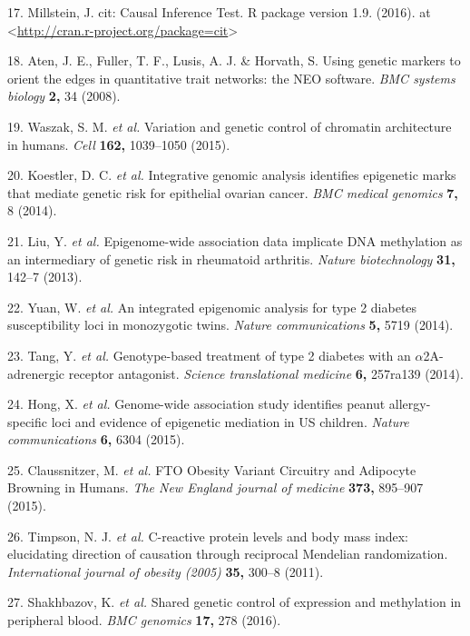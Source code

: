 \documentclass[]{article}
\begin{document}
\hypertarget{ref-Millstein2016}{}
17. Millstein, J. cit: Causal Inference Test. R package version 1.9.
(2016). at
\textless{}\url{http://cran.r-project.org/package=cit}\textgreater{}

\hypertarget{ref-Aten2008}{}
18. Aten, J. E., Fuller, T. F., Lusis, A. J. \& Horvath, S. Using
genetic markers to orient the edges in quantitative trait networks: the
NEO software. \emph{BMC systems biology} \textbf{2,} 34 (2008).

\hypertarget{ref-Waszak2015}{}
19. Waszak, S. M. \emph{et al.} Variation and genetic control of
chromatin architecture in humans. \emph{Cell} \textbf{162,} 1039--1050
(2015).

\hypertarget{ref-Koestler2014}{}
20. Koestler, D. C. \emph{et al.} Integrative genomic analysis
identifies epigenetic marks that mediate genetic risk for epithelial
ovarian cancer. \emph{BMC medical genomics} \textbf{7,} 8 (2014).

\hypertarget{ref-Liu2013}{}
21. Liu, Y. \emph{et al.} Epigenome-wide association data implicate DNA
methylation as an intermediary of genetic risk in rheumatoid arthritis.
\emph{Nature biotechnology} \textbf{31,} 142--7 (2013).

\hypertarget{ref-Yuan2014}{}
22. Yuan, W. \emph{et al.} An integrated epigenomic analysis for type 2
diabetes susceptibility loci in monozygotic twins. \emph{Nature
communications} \textbf{5,} 5719 (2014).

\hypertarget{ref-Tang2014}{}
23. Tang, Y. \emph{et al.} Genotype-based treatment of type 2 diabetes
with an \(\alpha\)2A-adrenergic receptor antagonist. \emph{Science
translational medicine} \textbf{6,} 257ra139 (2014).

\hypertarget{ref-Hong2015}{}
24. Hong, X. \emph{et al.} Genome-wide association study identifies
peanut allergy-specific loci and evidence of epigenetic mediation in US
children. \emph{Nature communications} \textbf{6,} 6304 (2015).

\hypertarget{ref-Claussnitzer2015}{}
25. Claussnitzer, M. \emph{et al.} FTO Obesity Variant Circuitry and
Adipocyte Browning in Humans. \emph{The New England journal of medicine}
\textbf{373,} 895--907 (2015).

\hypertarget{ref-Timpson2011}{}
26. Timpson, N. J. \emph{et al.} C-reactive protein levels and body mass
index: elucidating direction of causation through reciprocal Mendelian
randomization. \emph{International journal of obesity (2005)}
\textbf{35,} 300--8 (2011).

\hypertarget{ref-Shakhbazov2016}{}
27. Shakhbazov, K. \emph{et al.} Shared genetic control of expression
and methylation in peripheral blood. \emph{BMC genomics} \textbf{17,}
278 (2016).
\end{document}
